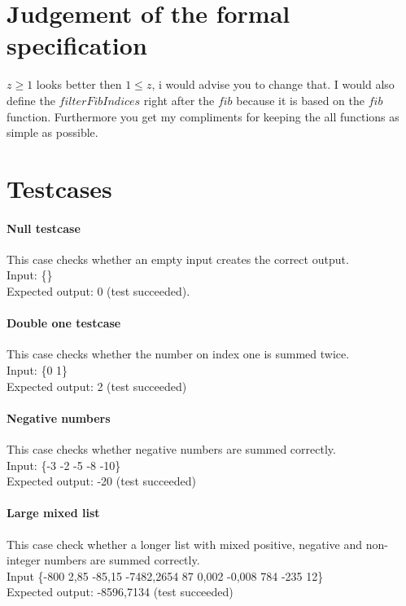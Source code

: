 \documentclass[12pt]{article}
\begin{document}
\section{Judgement of the formal specification}

$z \geq 1$ looks better then $1 \leq z$, i would advise you to change that. I would also define the $filterFibIndices$ right after the $fib$ because it is based on the $fib$ function. Furthermore you get my compliments for keeping the all functions as simple as possible.

\section{Testcases}

\paragraph{Null testcase}
This case checks whether an empty input creates the correct output. \\
Input: \{\} \\
Expected output: 0 (test succeeded).

\paragraph{Double one testcase}
This case checks whether the number on index one is summed twice. \\
Input: \{0 1\} \\
Expected output: 2 (test succeeded)

\paragraph{Negative numbers}
This case checks whether negative numbers are summed correctly. \\
Input: \{-3 -2 -5 -8 -10\} \\
Expected output: -20 (test succeeded)

\paragraph{Large mixed list}
This case check whether a longer list with mixed positive, negative and non-integer numbers are summed correctly. \\
Input \{-800 2,85 -85,15 -7482,2654 87 0,002 -0,008 784 -235 12\} \\
Expected output: -8596,7134 (test succeeded)
\end{document}
